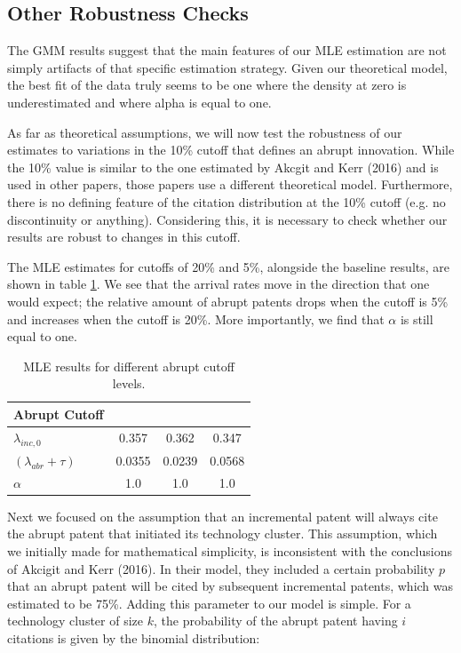 \documentclass[letterpaper,12pt]{article}
\theoremstyle{definition}
\begin{document}
\subsection{Other Robustness Checks}

The GMM results suggest that the main features of our MLE estimation are not simply artifacts of that specific estimation strategy. Given our theoretical model, the best fit of the data truly seems to be one where the density at zero is underestimated and where alpha is equal to one.

As far as theoretical assumptions, we will now test the robustness of our estimates to variations in the 10\% cutoff that defines an abrupt innovation. While the 10\% value is similar to the one estimated by Akcgit and Kerr (2016) and is used in other papers, those papers use a different theoretical model. Furthermore, there is no defining feature of the citation distribution at the 10\% cutoff (e.g. no discontinuity or anything). Considering this, it is necessary to check whether our results are robust to changes in this cutoff.

The MLE estimates for cutoffs of 20\% and 5\%, alongside the baseline results, are shown in table \ref{tab:Cutoff}. We see that the arrival rates move in the direction that one would expect; the relative amount of abrupt patents drops when the cutoff is 5\% and increases when the cutoff is 20\%. More importantly, we find that $\alpha$ is still equal to one.

\begin{table}[htbp]
	\caption{MLE results for different abrupt cutoff levels.}
	\centering\label{tab:Cutoff}
	\begin{tabular}{>{\small}l >{\small}c >{\small}c >{\small}c}
		\toprule
		Abrupt Cutoff & \multicolumn{1}{c}{10\%} & \multicolumn{1}{c}{5\%} & \multicolumn{1}{c}{20\%}\\ 
		\midrule
		$\lambda_{inc, 0}$ & 0.357 & 0.362 & 0.347 \\
		$(\lambda_{abr} + \tau)$ & 0.0355 & 0.0239 & 0.0568\\
		$\alpha$ & 1.0 & 1.0 & 1.0\\
		\bottomrule
	\end{tabular}
\end{table}

Next we focused on the assumption that an incremental patent will always cite the abrupt patent that initiated its technology cluster. This assumption, which we initially made for mathematical simplicity, is inconsistent with the conclusions of Akcigit and Kerr (2016). In their model, they included a certain probability $p$ that an abrupt patent will be cited by subsequent incremental patents, which was estimated to be 75\%. Adding this parameter to our model is simple. For a technology cluster of size $k$, the probability of the abrupt patent having $i$ citations is given by the binomial distribution:
\end{document}
